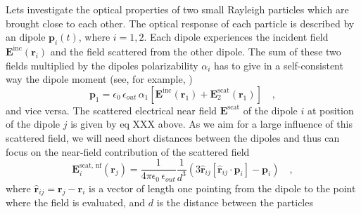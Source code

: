 Lets investigate the optical properties of two small Rayleigh particles which are brought close to each other.  The optical response of each particle is described by  an dipole $ \mathbf{p}_i(t)$, where $i = 1,2$.
 Each dipole experiences the incident field
$\mathbf{E}^{\text{inc}}(\mathbf{r}_i)$ and the field scattered from the other dipole.
The sum of these two fields multiplied by the dipoles polarizability $\alpha_i$
has to give in a self-consistent way the dipole moment (see, for example, \cite{Myroshnychenko08})
%
\begin{equation} \label{eq:equationsystem}
     \mathbf{p}_1 = \epsilon_0 \,  \epsilon_{out} \,  \alpha_1 \left[ \mathbf{E}^{\text{inc}} (\mathbf{r}_1) +
\mathbf{E}^{\text{scat}}_2(\mathbf{r}_1) \right] \quad ,
\end{equation}
%
and vice versa. The scattered electrical near field $ \mathbf{E}^{\text{scat}}$ of the dipole $i$ at position of the dipole $j$ is given by eq XXX above. As we aim  for a large influence of this scattered field, we will need short distances between the dipoles and thus can focus on the near-field contribution of the scattered field
\begin{equation}
  \mathbf{E}^{\text{scat, nf}}_i(\mathbf{r}_j) = \frac{ 1 }{4\pi\epsilon_0 \, \epsilon_{out}}  \frac{1}{d^3}
        \left( 3\hat{\mathbf{r}}_{ij} \left[\hat{\mathbf{r}}_{ij} \cdot \mathbf{p}_i \right] - \mathbf{p}_i \right)
  \quad ,
\end{equation}
where $\hat{\mathbf{r}}_{ij}   = \mathbf{r} _j - \mathbf{r} _i$ is a vector of length one pointing from the dipole to the point where
the field is evaluated, and $d$ is the distance between the particles


